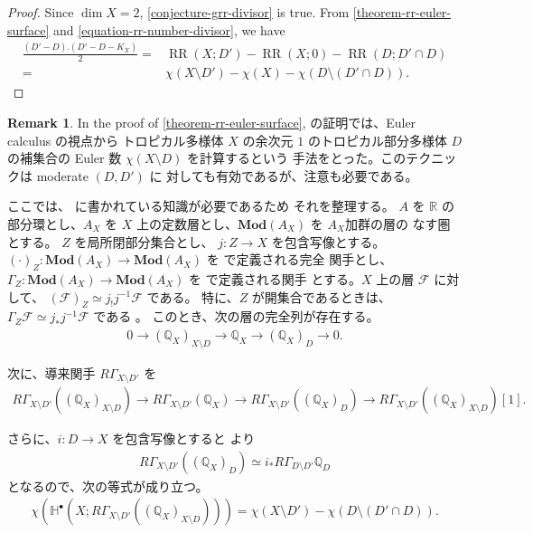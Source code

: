 \documentclass[a4paper,dvipdfmx,reqno,12pt]{amsart}
\theoremstyle{definition}
\newtheorem{remark}[theorem]{Remark}
\newcommand{\opn}[1]{\operatorname{#1}}
\newcommand{\catn}[1]{\mathbf{#1}}
\numberwithin{equation}{section}
\begin{document}
\begin{proof}
Since $\dim X=2$, 
\cref{conjecture-grr-divisor} is true.
From \cref{theorem-rr-euler-surface} and 
\eqref{equation-rr-number-divisor}, we have
\begin{align}
\frac{(D'-D).(D'-D-K_X)}{2}=&
\opn{RR}(X;D')-\opn{RR}(X;0)-
\opn{RR}(D;D'\cap D) \\
=&\chi(X\setminus D')-\chi(X)-\chi(D\setminus (D'\cap D)).
\end{align}
\end{proof}



\begin{remark}
In the proof of \cref{theorem-rr-euler-surface}, 
の証明では、Euler calculus の視点から
トロピカル多様体 $X$ の余次元 $1$ のトロピカル部分多様体
$D$ の補集合の Euler 数 $\chi(X\setminus D)$ を計算するという
手法をとった。このテクニックは moderate  $(D,D')$ に
対しても有効であるが、注意も必要である。

ここでは、\cite{MR1299726} に書かれている知識が必要であるため
それを整理する。
$A$ を $\mathbb{R}$ の部分環とし、$A_X$ を
$X$ 上の定数層とし、$\catn{Mod}(A_X)$ を $A_X$加群の層の
なす圏とする。
$Z$ を局所閉部分集合とし、
$j\colon Z\to X$ を包含写像とする。
$(\cdot)_{Z}\colon \catn{Mod}(A_X) \to \catn{Mod}(A_X)$
を \cite[Proposition 2.3.6]{MR1299726} で定義される完全
関手とし、
$\Gamma_{Z}\colon \catn{Mod}(A_X) \to \catn{Mod}(A_X)$
を \cite[Definition 2.3.8]{MR1299726} で定義される関手
とする。$X$ 上の層 $\mathcal{F}$ に対して、
$(\mathcal{F})_{Z}\simeq j_!j^{-1}\mathcal{F}$ である。
特に、$Z$ が開集合であるときは、
$\Gamma_{Z}\mathcal{F}\simeq
j_*j^{-1}\mathcal{F}$ である
\cite[Proposition 2.3.9 (iii)]{MR1299726}。
このとき、次の層の完全列が存在する。
\begin{align}
\label{equation-closed-open-exact}
0 \to (\mathbb{Q}_X)_{X\setminus D}
\to \mathbb{Q}_X \to (\mathbb{Q}_X)_{D} \to 0.
\end{align}

次に、導来関手 $R\Gamma_{X\setminus D'}$ を
\begin{align}
R\Gamma_{X\setminus D'}((\mathbb{Q}_X)_{X\setminus D})
\to  R\Gamma_{X\setminus D'}(\mathbb{Q}_X)
\to R\Gamma_{X\setminus D'}((\mathbb{Q}_X)_D)
\to R\Gamma_{X\setminus D'}((\mathbb{Q}_X)_{X\setminus D})[1].
\end{align}


さらに、$i\colon D\to X$ を包含写像とすると
\cite[(2.3.20)]{MR1299726} より
\begin{align}
R\Gamma_{X\setminus D'}((\mathbb{Q}_X)_D)
\simeq i_* R\Gamma_{D\setminus D'}\mathbb{Q}_D
\end{align}
となるので、次の等式が成り立つ。
\begin{align}
\chi(\mathbb{H}^{\bullet}(X;R\Gamma_{X\setminus D'}((\mathbb{Q}_X)_{X\setminus D})))
= \chi(X\setminus D')
- \chi(D\setminus (D'\cap D)).
\end{align}


\end{remark}
\end{document}
